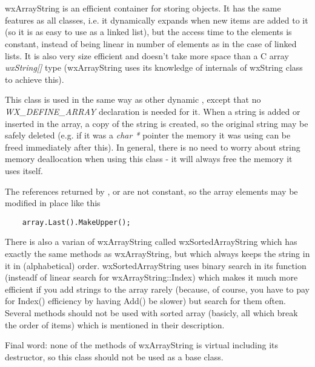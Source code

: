 \section{}\label{wxarraystring}

wxArrayString is an efficient container for storing 
 objects. It has the same features as all 
 classes, i.e. it dynamically expands when new items
are added to it (so it is as easy to use as a linked list), but the access
time to the elements is constant, instead of being linear in number of
elements as in the case of linked lists. It is also very size efficient and
doesn't take more space than a C array {\it wxString[]} type (wxArrayString
uses its knowledge of internals of wxString class to achieve this).

This class is used in the same way as other dynamic ,
except that no {\it WX\_DEFINE\_ARRAY} declaration is needed for it. When a
string is added or inserted in the array, a copy of the string is created, so
the original string may be safely deleted (e.g. if it was a {\it char *} 
pointer the memory it was using can be freed immediately after this). In
general, there is no need to worry about string memory deallocation when using
this class - it will always free the memory it uses itself.

The references returned by , 
 or 
 are not constant, so the
array elements may be modified in place like this

\begin{verbatim}
    array.Last().MakeUpper();
\end{verbatim}

There is also a varian of wxArrayString called wxSortedArrayString which has
exactly the same methods as wxArrayString, but which always keeps the string
in it in (alphabetical) order. wxSortedArrayString uses binary search in its 
 function (insteadf of linear search for
wxArrayString::Index) which makes it much more efficient if you add strings to
the array rarely (because, of course, you have to pay for Index() efficiency
by having Add() be slower) but search for them often. Several methods should
not be used with sorted array (basicly, all which break the order of items)
which is mentioned in their description.

Final word: none of the methods of wxArrayString is virtual including its
destructor, so this class should not be used as a base class.

